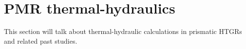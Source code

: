 \section{PMR thermal-hydraulics}

This section will talk about thermal-hydraulic calculations in prismatic HTGRs and related past studies.
